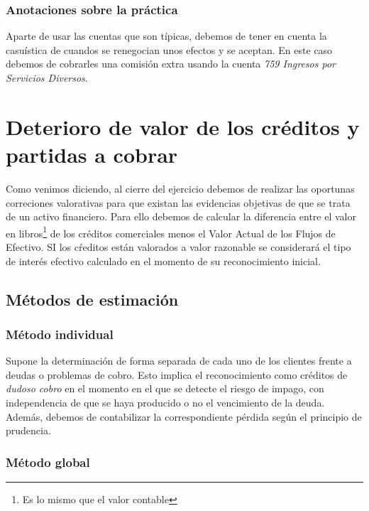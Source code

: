\documentclass[a4paper,12pt]{article}
\begin{document}
\subsubsection*{Anotaciones sobre la práctica}

Aparte de usar las cuentas que son típicas, debemos de tener en cuenta la casuística de cuandos se renegocian unos efectos y se aceptan. En este caso debemos de cobrarles una comisión extra usando la cuenta \textit{759 Ingresos por Servicios Diversos}.


\section{Deterioro de valor de los créditos y partidas a cobrar}

Como venimos diciendo, al cierre del ejercicio debemos de realizar las oportunas correciones valorativas para que existan las evidencias objetivas de que se trata de un activo financiero. Para ello debemos de calcular la diferencia entre el valor en libros\footnote{Es lo mismo que el valor contable} de los créditos comerciales menos el Valor Actual de los Flujos de Efectivo. SI los cŕeditos están valorados a valor razonable se considerará el tipo de interés efectivo calculado en el momento de su reconocimiento inicial.\\

\subsection{Métodos de estimación }

\subsubsection{Método individual}

Supone la determinación de forma separada de cada uno de los clientes frente a deudas o problemas de cobro. Esto implica el reconocimiento como créditos de \textit{dudoso cobro} en el momento en el que se detecte el riesgo de impago, con independencia de que se haya producido o no el vencimiento de la deuda. Además, debemos de contabilizar la correspondiente pérdida según el principio de prudencia.\\

\subsubsection{Método global}
\end{document}
